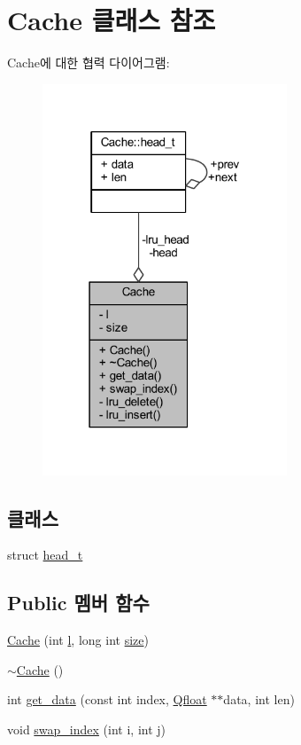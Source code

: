 \hypertarget{class_cache}{\section{Cache 클래스 참조}
\label{class_cache}
}


Cache에 대한 협력 다이어그램\+:
\nopagebreak
\begin{figure}[H]
\begin{center}
\leavevmode
\includegraphics[width=207pt]{class_cache__coll__graph}
\end{center}
\end{figure}
\subsection*{클래스}
\begin{DoxyCompactItemize}
\item 
struct \hyperlink{struct_cache_1_1head__t}{head\+\_\+t}
\end{DoxyCompactItemize}
\subsection*{Public 멤버 함수}
\begin{DoxyCompactItemize}
\item 
\hyperlink{class_cache_a2823f543d4f9b92c29472b904961afe1}{Cache} (int \hyperlink{class_cache_a8f5881aa763cb4af5cfb7b6bda0cff35}{l}, long int \hyperlink{class_cache_af50a89d0734a160cf812384df64599f9}{size})
\item 
\hyperlink{class_cache_af8b171a6c49d88d3ba179477484b9d48}{$\sim$\+Cache} ()
\item 
int \hyperlink{class_cache_aca49263fb34641e208884cc223b25317}{get\+\_\+data} (const int index, \hyperlink{svm_8cpp_a8755d90a54ecfb8d15051af3e0542592}{Qfloat} $\ast$$\ast$data, int len)
\item 
void \hyperlink{class_cache_aaff2dc955f9492c044c98a5f09cfddcc}{swap\+\_\+index} (int i, int j)
\end{DoxyCompactItemize}
